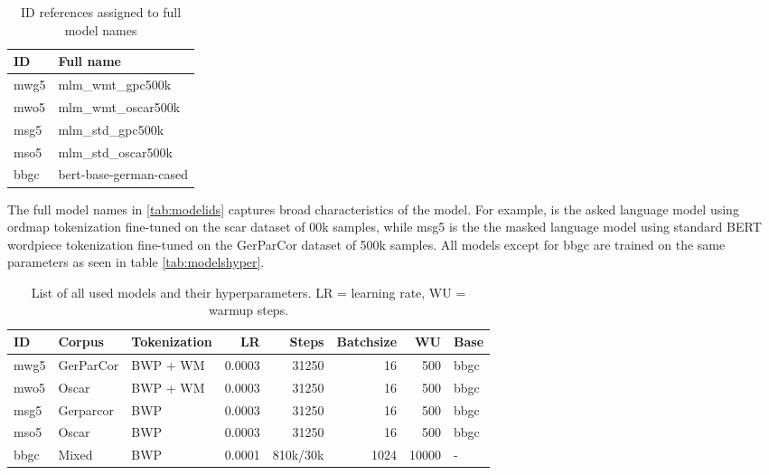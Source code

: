 \begin{table}[h]
    \centering
    \begin{tabular}{ll}
        \toprule
        \textbf{ID} & \textbf{Full name} \\
        \midrule
        mwg5 & mlm\_wmt\_gpc500k \\
        mwo5 & mlm\_wmt\_oscar500k \\
        msg5 & mlm\_std\_gpc500k \\
        mso5 & mlm\_std\_oscar500k \\
        bbgc & bert-base-german-cased \\
        \bottomrule
    \end{tabular}
    \caption{ID references assigned to full model names}
    \label{tab:modelids}
\end{table}

The full model names in \autoref{tab:modelids} captures broad characteristics of the model.
For example,  is the asked language model using ordmap tokenization fine-tuned on the scar dataset of 00k samples, while msg5 is the the masked language model using standard BERT wordpiece tokenization fine-tuned on the GerParCor dataset of 500k samples.
All models except for bbgc are trained on the same parameters as seen in table \autoref{tab:modelshyper}.\\

\begin{table}[h]
    \centering
    \begin{tabular}{lllrrrrl}
        \toprule
        \textbf{ID} & \textbf{Corpus} & \textbf{Tokenization} & \textbf{LR} & \textbf{Steps} & \textbf{Batchsize} & \textbf{WU} & \textbf{Base} \\
        \midrule
        mwg5 & GerParCor & BWP + WM & 0.0003 & 31250 & 16 & 500 & bbgc \\
        mwo5 & Oscar & BWP + WM & 0.0003 & 31250 & 16 & 500 &  bbgc \\
        msg5 & Gerparcor & BWP & 0.0003 & 31250 & 16 & 500 &  bbgc \\
        mso5 & Oscar & BWP & 0.0003 & 31250 & 16 & 500 &  bbgc \\
        bbgc & Mixed & BWP & 0.0001 & 810k/30k & 1024 & 10000 & - \\
        \bottomrule
    \end{tabular}
    \caption[List of all used models]{List of all used models and their hyperparameters. LR = learning rate, WU = warmup steps.}
    \label{tab:modelshyper}
\end{table}

